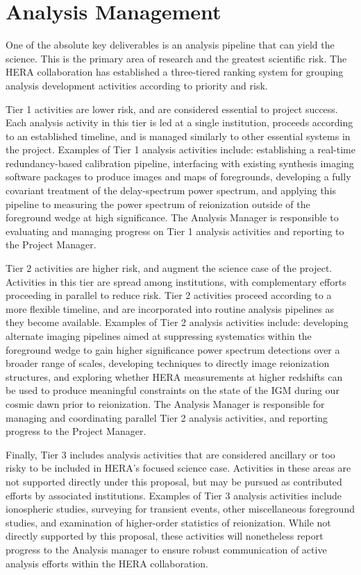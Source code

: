 \documentclass[preprint]{aastex}
\begin{document}
\section{Analysis Management}
\label{sec:analysis}

One of the absolute key deliverables is an analysis pipeline that can yield the science.  This is the primary area of
research and the greatest scientific risk.  The HERA collaboration has established
a three-tiered ranking system for grouping analysis development activities according to priority and risk.

Tier 1 activities are lower risk, and are considered essential to project success.  Each analysis activity
in this tier is led at a single institution, proceeds according to an established timeline, and is managed
similarly to other essential systems in the project.  Examples of Tier 1 analysis activities include:
establishing a real-time redundancy-based calibration pipeline, interfacing with existing synthesis imaging
software packages to produce images and maps of foregrounds, developing a fully covariant treatment of
the delay-spectrum power spectrum, and applying this pipeline to measuring the power spectrum of reionization
outside of the foreground wedge at high significance.
The Analysis Manager is responsible to evaluating
and managing progress on Tier 1 analysis activities and reporting to the Project Manager.

Tier 2 activities are higher risk, and augment the science case of the project.  Activities in
this tier are spread among institutions, with complementary efforts proceeding in parallel to
reduce risk.  Tier 2 activities proceed according to a more flexible timeline, and are incorporated
into routine analysis pipelines as they become available.  Examples of Tier 2 analysis activities
include:
developing alternate imaging pipelines aimed at suppressing systematics within the foreground wedge
to gain higher significance power spectrum detections over a broader range of scales, developing
techniques to directly image reionization structures, and exploring whether HERA measurements at
higher redshifts can be used to produce meaningful constraints on the state of the IGM during
our cosmic dawn prior to reionization.  The Analysis Manager is responsible for managing and coordinating
parallel Tier 2 analysis activities, and reporting progress to the Project Manager.

Finally, Tier 3 includes analysis activities that are considered ancillary or too risky to
be included in HERA's focused science case.
Activities in these areas are not supported directly under this proposal, but may be pursued as
contributed efforts by associated institutions.  Examples of Tier 3 analysis activities include
ionospheric studies, surveying for transient events, other miscellaneous foreground studies, and
examination of higher-order statistics of reionization.  While not directly supported by this proposal,
these activities will nonetheless report progress to the Analysis manager to ensure
robust communication of active analysis efforts within the HERA collaboration.
\end{document}
